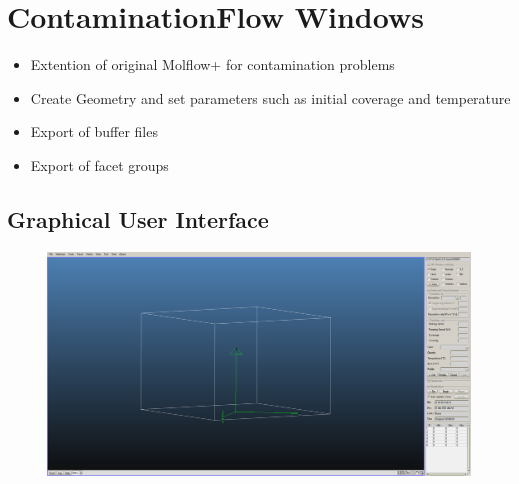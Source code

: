 
\chapter{ContaminationFlow Windows}\label{chapter:Windows}

\begin{itemize}[noitemsep,topsep=0pt]
\item Extention of original Molflow+ for contamination problems
\item Create Geometry and set parameters such as initial coverage and temperature
\item Export of buffer files
\item Export of facet groups %
\end{itemize}

\section{Graphical User Interface}
\begin{figure}[h]
\includegraphics[width=\linewidth]{figures/ContWin}
\end{figure}

